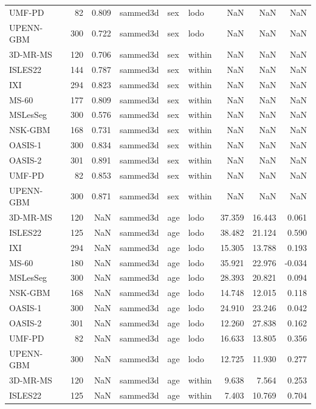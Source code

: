 \begin{tabular}{lrrlllrrr}
UMF-PD & 82 & 0.809 & sammed3d & sex & lodo & NaN & NaN & NaN \\
UPENN-GBM & 300 & 0.722 & sammed3d & sex & lodo & NaN & NaN & NaN \\
3D-MR-MS & 120 & 0.706 & sammed3d & sex & within & NaN & NaN & NaN \\
ISLES22 & 144 & 0.787 & sammed3d & sex & within & NaN & NaN & NaN \\
IXI & 294 & 0.823 & sammed3d & sex & within & NaN & NaN & NaN \\
MS-60 & 177 & 0.809 & sammed3d & sex & within & NaN & NaN & NaN \\
MSLesSeg & 300 & 0.576 & sammed3d & sex & within & NaN & NaN & NaN \\
NSK-GBM & 168 & 0.731 & sammed3d & sex & within & NaN & NaN & NaN \\
OASIS-1 & 300 & 0.834 & sammed3d & sex & within & NaN & NaN & NaN \\
OASIS-2 & 301 & 0.891 & sammed3d & sex & within & NaN & NaN & NaN \\
UMF-PD & 82 & 0.853 & sammed3d & sex & within & NaN & NaN & NaN \\
UPENN-GBM & 300 & 0.871 & sammed3d & sex & within & NaN & NaN & NaN \\
3D-MR-MS & 120 & NaN & sammed3d & age & lodo & 37.359 & 16.443 & 0.061 \\
ISLES22 & 125 & NaN & sammed3d & age & lodo & 38.482 & 21.124 & 0.590 \\
IXI & 294 & NaN & sammed3d & age & lodo & 15.305 & 13.788 & 0.193 \\
MS-60 & 180 & NaN & sammed3d & age & lodo & 35.921 & 22.976 & -0.034 \\
MSLesSeg & 300 & NaN & sammed3d & age & lodo & 28.393 & 20.821 & 0.094 \\
NSK-GBM & 168 & NaN & sammed3d & age & lodo & 14.748 & 12.015 & 0.118 \\
OASIS-1 & 300 & NaN & sammed3d & age & lodo & 24.910 & 23.246 & 0.042 \\
OASIS-2 & 301 & NaN & sammed3d & age & lodo & 12.260 & 27.838 & 0.162 \\
UMF-PD & 82 & NaN & sammed3d & age & lodo & 16.633 & 13.805 & 0.356 \\
UPENN-GBM & 300 & NaN & sammed3d & age & lodo & 12.725 & 11.930 & 0.277 \\
3D-MR-MS & 120 & NaN & sammed3d & age & within & 9.638 & 7.564 & 0.253 \\
ISLES22 & 125 & NaN & sammed3d & age & within & 7.403 & 10.769 & 0.704 \\

\end{tabular}
